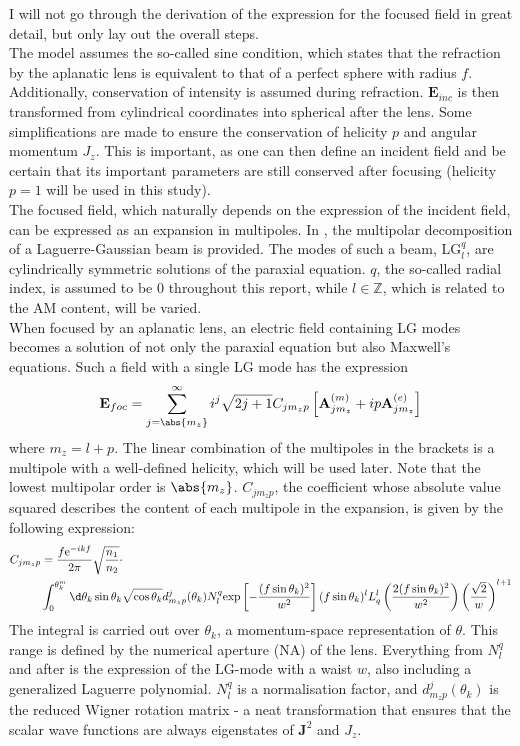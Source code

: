 I will not go through the derivation of the expression for the focused field in great detail, but only lay out the overall steps.\\
The model assumes the so-called sine condition, which states that the refraction by the aplanatic lens is equivalent to that of a perfect sphere with radius $f$. Additionally, conservation of intensity is assumed during refraction. $\mathbf{E}_{inc}$ is then transformed from cylindrical coordinates into spherical after the lens. Some simplifications are made to ensure the conservation of helicity $p$ and angular momentum $J_z$. This is important, as one can then define an incident field and be certain that its important parameters are still conserved after focusing (helicity $p=1$ will be used in this study).\\
The focused field, which naturally depends on the expression of the incident field, can be expressed as an expansion in multipoles. In \cite{xavi}, the multipolar decomposition of a Laguerre-Gaussian beam is provided. The modes of such a beam, $\mathrm{LG}_l^q$, are cylindrically symmetric solutions of the paraxial equation. $q$, the so-called radial index, is assumed to be 0 throughout this report, while $l\in \mathbb{Z}$, which is related to the AM content, will be varied.\\
When focused by an aplanatic lens, an electric field containing LG modes becomes a solution of not only the paraxial equation but also Maxwell's equations\cite{xavi}. Such a field with a single LG mode has the expression
\begin{equation}\label{eq:Efoc}
    \mathbf{E}_{foc}=\sum_{j=\abs{m_z}}^\infty i^j\sqrt{2j+1}C_{jm_zp}\left[
    \mathbf{A}_{jm_z}^{(m)}+ip\mathbf{A}_{jm_z}^{(e)}\right]
\end{equation}
where $m_z=l+p$. The linear combination of the multipoles in the brackets is a multipole with a well-defined helicity, which will be used later. Note that the lowest multipolar order is $\abs{m_z}$.
$C_{jm_zp}$, the coefficient whose absolute value squared describes the content of each multipole in the expansion, is given by the following expression:
\begin{align}
    \label{eq:C_foc}
    C_{jm_zp}&=\frac{f\mathrm{e}^{-ikf}}{2\pi}\sqrt{\frac{n_1}{n_2}}\cdot\\&\int_0^{\theta_k^{m}}
    \d\theta_k\sin\theta_k\sqrt{\cos\theta_k}d^j_{m_zp}(\theta_k)N_l^q
    \mathrm{exp}\left[-\frac{(f\sin\theta_k)^2}{w^2}
    \right](f\sin\theta_k)^l L_q^l\left(\frac{2(f\sin\theta_k)^2}{w^2}
    \right)\left(\frac{\sqrt{2}}{w}\right)^{l+1}
\end{align}
The integral is carried out over $\theta_k$, a momentum-space representation of $\theta$. This range is defined by the numerical aperture (NA) of the lens. 
Everything from $N_l^q$ and after is the expression of the $\mathrm{LG}$-mode with a waist $w$, also including a generalized Laguerre polynomial. $N_l^q$ is a normalisation factor, and $d^j_{m_zp}(\theta_k)$ is the reduced Wigner rotation matrix - a neat transformation that ensures that the scalar wave functions are always eigenstates of $\mathbf{J}^2$ and $J_z$. 


